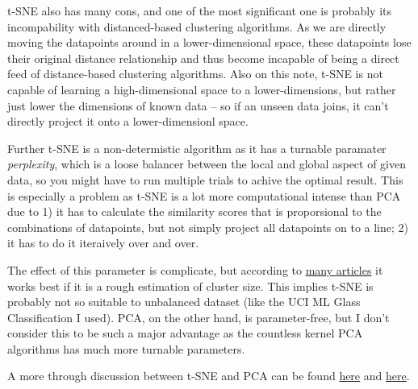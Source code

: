 \documentclass[11pt]{article}
\begin{document}
t-SNE also has many cons, and one of the most significant one is probably its incompability with distanced-based clustering algorithms. As we are directly moving the datapoints around in a lower-dimensional space, these datapoints lose their original distance relationship and thus become incapable of being a direct feed of distance-based clustering algorithms. Also on this note, t-SNE is not capable of learning a high-dimensional space to a lower-dimensions, but rather just lower the dimensions of known data -- so if an unseen data joins, it can't directly project it onto a lower-dimensionl space.\newline

Further t-SNE is a non-determistic algorithm as it has a turnable paramater \textit{perplexity}, which is a loose balancer between the local and global aspect of given data, so you might have to run multiple trials to achive the optimal result. This is especially a problem as t-SNE is a lot more computational intense than PCA due to 1) it has to calculate the similarity scores that is proporsional to the combinations of datapoints, but not simply project all datapoints on to a line; 2) it has to do it iteraively over and over.

The effect of this parameter is complicate, but according to \href{https://distill.pub/2016/misread-tsne/}{many articles} it works best if it is a rough estimation of cluster size. This implies t-SNE is probably not so suitable to unbalanced dataset (like the UCI ML Glass Classification I used). PCA, on the other hand, is parameter-free, but I don't consider this to be such a major advantage as the countless kernel PCA algorithms has much more turnable parameters.\newline

A more through discussion between t-SNE and PCA can be found \href{https://stats.stackexchange.com/questions/238538/are-there-cases-where-pca-is-more-suitable-than-t-sne}{here} and \href{https://stats.stackexchange.com/questions/263539/clustering-on-the-output-of-t-sne}{here}.
\end{document}
